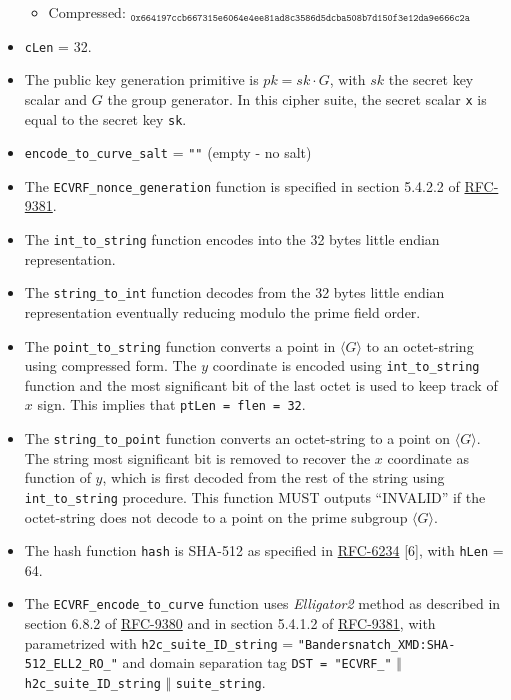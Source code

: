 \documentclass[
]{article}
\providecommand{\tightlist}{%
  \setlength{\itemsep}{0pt}\setlength{\parskip}{0pt}}
\begin{document}
\begin{itemize}
  \begin{itemize}
  \tightlist
  \item
    Compressed:
    \(_{\texttt{0x664197ccb667315e6064e4ee81ad8c3586d5dcba508b7d150f3e12da9e666c2a}}\)
  \end{itemize}
\item
  \texttt{cLen} = 32.
\item
  The public key generation primitive is \(pk = sk \cdot G\), with
  \(sk\) the secret key scalar and \(G\) the group generator. In this
  cipher suite, the secret scalar \texttt{x} is equal to the secret key
  \texttt{sk}.
\item
  \texttt{encode\_to\_curve\_salt} = \texttt{""} (empty - no salt)
\item
  The \texttt{ECVRF\_nonce\_generation} function is specified in section
  5.4.2.2 of \href{https://datatracker.ietf.org/doc/rfc9381}{RFC-9381}.
\item
  The \texttt{int\_to\_string} function encodes into the 32 bytes little
  endian representation.
\item
  The \texttt{string\_to\_int} function decodes from the 32 bytes little
  endian representation eventually reducing modulo the prime field
  order.
\item
  The \texttt{point\_to\_string} function converts a point in
  \(\langle G \rangle\) to an octet-string using compressed form. The
  \(y\) coordinate is encoded using \texttt{int\_to\_string} function
  and the most significant bit of the last octet is used to keep track
  of \(x\) sign. This implies that \texttt{ptLen\ =\ flen\ =\ 32}.
\item
  The \texttt{string\_to\_point} function converts an octet-string to a
  point on \(\langle G \rangle\). The string most significant bit is
  removed to recover the \(x\) coordinate as function of \(y\), which is
  first decoded from the rest of the string using
  \texttt{int\_to\_string} procedure. This function MUST outputs
  ``INVALID'' if the octet-string does not decode to a point on the
  prime subgroup \(\langle G \rangle\).
\item
  The hash function \texttt{hash} is SHA-512 as specified in
  \href{https://datatracker.ietf.org/doc/rfc6234}{RFC-6234} {[}6{]},
  with \texttt{hLen} = 64.
\item
  The \texttt{ECVRF\_encode\_to\_curve} function uses \emph{Elligator2}
  method as described in section 6.8.2 of
  \href{https://datatracker.ietf.org/doc/rfc9380}{RFC-9380} and in
  section 5.4.1.2 of
  \href{https://datatracker.ietf.org/doc/rfc9381}{RFC-9381}, with
  parametrized with \texttt{h2c\_suite\_ID\_string} =
  \texttt{"Bandersnatch\_XMD:SHA-512\_ELL2\_RO\_"} and domain separation
  tag \texttt{DST\ =\ "ECVRF\_"} \(\Vert\)
  \texttt{h2c\_suite\_ID\_string} \(\Vert\) \texttt{suite\_string}.
\end{itemize}
\end{document}
